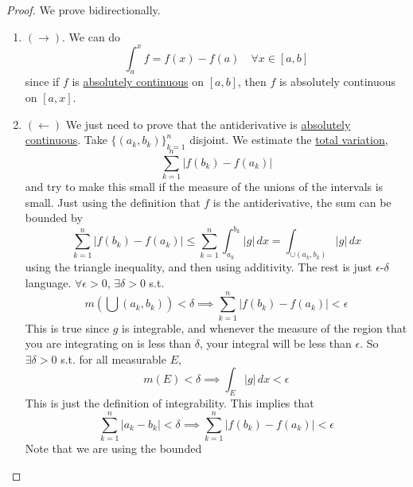   \begin{proof}
    We prove bidirectionally. 
    \begin{enumerate}
      \item $(\rightarrow)$. We can do 
      \begin{equation}
        \int_a^x f = f(x) - f(a) \quad \forall x \in [a, b]
      \end{equation}
      since if $f$ is \hyperref[def:absolutely-continuous-function]{absolutely continuous} on $[a, b]$, then $f$ is absolutely continuous on $[a, x]$.  

      \item $(\leftarrow)$ We just need to prove that the antiderivative is \hyperref[def:absolutely-continuous-function]{absolutely continuous}. Take $\{(a_k, b_k)\}_{k=1}^n$ disjoint. We estimate the \hyperref[def:total-variation]{total variation},
        \begin{equation}
          \sum_{k=1}^n |f(b_k) - f(a_k)| 
        \end{equation}
        and try to make this small if the measure of the unions of the intervals is small. Just using the definition that $f$ is the antiderivative, the sum can be bounded by 
        \begin{equation}
          \sum_{k=1}^n |f(b_k) - f(a_k)| \leq \sum_{k=1}^n \int_{a_k}^{b_k} |g| \,dx = \int_{\cup (a_k, b_k)} |g| \,dx 
        \end{equation}
        using the triangle inequality, and then using additivity. The rest is just $\epsilon$-$\delta$ language. $\forall \epsilon > 0$, $\exists \delta > 0$ s.t. 
        \begin{equation}
          m(\bigcup (a_k, b_k)) < \delta \implies \sum_{k=1}^n |f(b_k) - f(a_k)| < \epsilon
        \end{equation}
        This is true since $g$ is integrable, and whenever the measure of the region that you are integrating on is less than $\delta$, your integral will be less than $\epsilon$. So $\exists \delta > 0$ s.t. for all measurable $E$, 
        \begin{equation}
          m(E) < \delta \implies \int_E |g| \,dx < \epsilon
        \end{equation}
        This is just the definition of integrability. This implies that 
        \begin{equation}
          \sum_{k=1}^n |a_k - b_k| < \delta \implies \sum_{k=1}^n |f(b_k) - f(a_k)| < \epsilon 
        \end{equation}
        Note that we are using the bounded 
    \end{enumerate}
  \end{proof}

